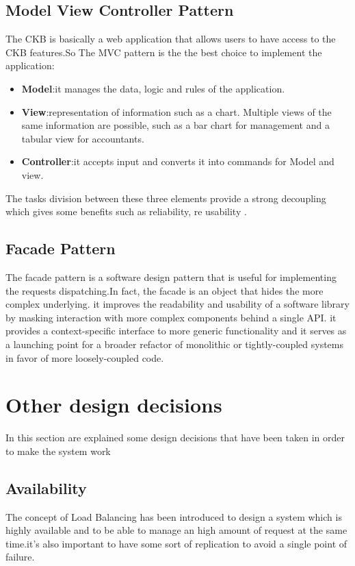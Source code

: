 \subsection{Model View Controller Pattern }
The CKB is basically a web application that allows users to have access to the CKB features.So The MVC pattern is the the best choice to implement the application:

    \begin{itemize}
        \item  \textbf{Model}:it manages the data, logic and rules of the application.
        \item  \textbf{View}:representation of information such as a chart. Multiple views of the same information are possible, such as a bar chart for management and a tabular view for accountants. 
        \item   \textbf{Controller}:it accepts input and converts it into commands for Model and view.
    \end{itemize}
    
The tasks division between these three elements provide a  strong decoupling which gives some benefits such as reliability, re usability .      

\subsection{Facade Pattern}
The facade pattern is a software design pattern that is useful for implementing the requests dispatching.In fact, the facade is an object that hides the more complex underlying. it improves the readability and usability of a software library by masking interaction with more complex components behind a single  API. it provides a context-specific interface to more generic functionality and it serves as a launching point for a broader refactor of monolithic or tightly-coupled systems in favor of more loosely-coupled code.
 
\section{Other design decisions}
In this section are explained some design decisions that have been taken in order to make the system work

\subsection{Availability}
The concept of Load Balancing has been introduced to design a system which is highly available and to be able to manage an high amount of request at the same time.it's also important to have some sort of replication to avoid a single point of failure.

